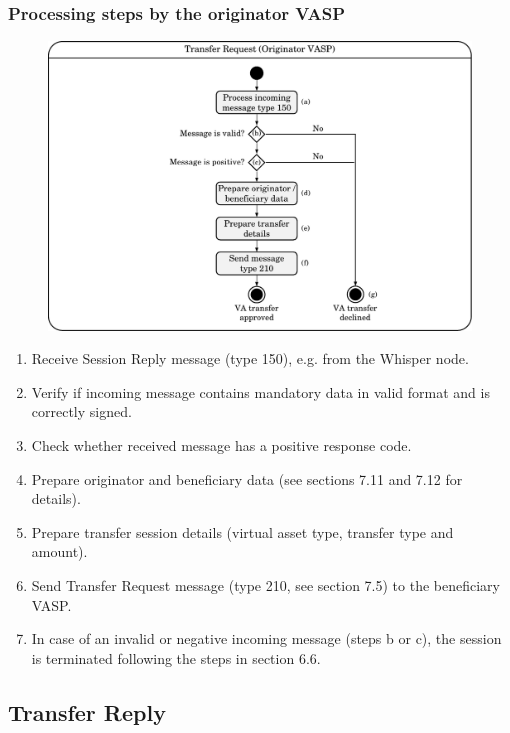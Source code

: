 \documentclass{article}
\begin{document}
\subsubsection{Processing steps by the originator VASP}
\begin{figure}[h]
    \centering
    \includegraphics[width=\textwidth]{g11.pdf}
\end{figure}
\begin{enumerate}
    \item Receive Session Reply message (type 150), e.g. from the Whisper node.
    \item Verify if incoming message contains mandatory data in valid format and is correctly signed.
    \item Check whether received message has a positive response code.
    \item Prepare originator and beneficiary data (see sections 7.11 and 7.12 for details).
    \item Prepare transfer session details (virtual asset type, transfer type and amount).
    \item Send Transfer Request message (type 210, see section 7.5) to the beneficiary VASP.
    \item In case of an invalid or negative incoming message (steps b or c), the session is terminated following the steps in section 6.6.
\end{enumerate}


\subsection{Transfer Reply}
\end{document}
